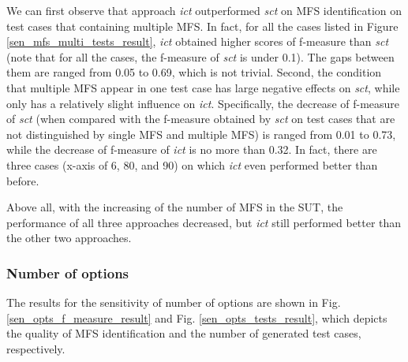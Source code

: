 \documentclass[10pt,journal,compsoc]{IEEEtran}
\begin{document}
{We can first observe that approach \emph{ict} outperformed \emph{sct} on MFS identification on test cases that containing multiple MFS. In fact, for all the cases listed in Figure \ref{sen_mfs_multi_tests_result}, \emph{ict} obtained higher scores of f-measure than \emph{sct} (note that for all the cases, the f-measure of \emph{sct} is under 0.1). The gaps between them are ranged from 0.05 to 0.69, which is not trivial. Second, the condition that multiple MFS appear in one test case has large negative effects on \emph{sct}, while only has a relatively slight influence on \emph{ict}. Specifically, the decrease of f-measure of \emph{sct} (when compared with the f-measure obtained by \emph{sct} on test cases that are not distinguished by single MFS and multiple MFS) is ranged from 0.01 to 0.73, while the decrease of f-measure of \emph{ict} is no more than 0.32. In fact, there are three cases (x-axis of 6, 80, and 90) on which \emph{ict} even performed better than before.
}



Above all, with the increasing of the number of MFS in the SUT, the performance of all three approaches decreased, but \emph{ict} still performed better than the other two approaches.


\subsubsection{Number of options}
The results for the sensitivity of number of options are shown in Fig. \ref{sen_opts_f_measure_result} and Fig. \ref{sen_opts_tests_result}, which depicts the quality of MFS identification and the number of generated test cases, respectively.
\end{document}
